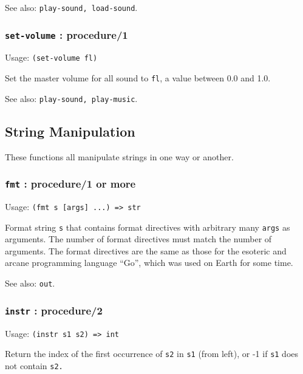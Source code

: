 \documentclass[
]{article}
\newcommand{\passthrough}[1]{#1}
\begin{document}
See also: \passthrough{\lstinline!play-sound, load-sound!}.

\hypertarget{set-volume-procedure1}{%
\subsubsection{\texorpdfstring{\texttt{set-volume} :
procedure/1}{set-volume : procedure/1}}\label{set-volume-procedure1}}

Usage: \passthrough{\lstinline!(set-volume fl)!}

Set the master volume for all sound to \passthrough{\lstinline!fl!}, a
value between 0.0 and 1.0.

See also: \passthrough{\lstinline!play-sound, play-music!}.

\hypertarget{string-manipulation}{%
\subsection{String Manipulation}\label{string-manipulation}}

These functions all manipulate strings in one way or another.

\hypertarget{fmt-procedure1-or-more}{%
\subsubsection{\texorpdfstring{\texttt{fmt} : procedure/1 or
more}{fmt : procedure/1 or more}}\label{fmt-procedure1-or-more}}

Usage: \passthrough{\lstinline!(fmt s [args] ...) => str!}

Format string \passthrough{\lstinline!s!} that contains format
directives with arbitrary many \passthrough{\lstinline!args!} as
arguments. The number of format directives must match the number of
arguments. The format directives are the same as those for the esoteric
and arcane programming language ``Go'', which was used on Earth for some
time.

See also: \passthrough{\lstinline!out!}.

\hypertarget{instr-procedure2}{%
\subsubsection{\texorpdfstring{\texttt{instr} :
procedure/2}{instr : procedure/2}}\label{instr-procedure2}}

Usage: \passthrough{\lstinline!(instr s1 s2) => int!}

Return the index of the first occurrence of \passthrough{\lstinline!s2!}
in \passthrough{\lstinline!s1!} (from left), or -1 if
\passthrough{\lstinline!s1!} does not contain
\passthrough{\lstinline!s2.!}
\end{document}
